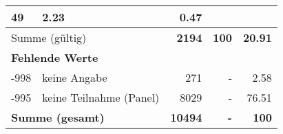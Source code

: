 \begin{longtable}{lXrrr}
       \num{49} &
       \num[round-mode=places,round-precision=2]{2,23} &
         \num[round-mode=places,round-precision=2]{0,47} \\
     \midrule
     \multicolumn{2}{l}{Summe (gültig)} &
       \textbf{\num{2194}} &
     \textbf{100} &
       \textbf{\num[round-mode=places,round-precision=2]{20,91}} \\
     \multicolumn{5}{l}{\textbf{Fehlende Werte}}\\
       -998 &
       keine Angabe &
         \num{271} &
        - &
         \num[round-mode=places,round-precision=2]{2,58} \\
       -995 &
       keine Teilnahme (Panel) &
         \num{8029} &
        - &
         \num[round-mode=places,round-precision=2]{76,51} \\
     \midrule
     \multicolumn{2}{l}{\textbf{Summe (gesamt)}} &
          \textbf{\num{10494}} &
        \textbf{-} &
        \textbf{100} \\
     \bottomrule
     \end{longtable}
     
